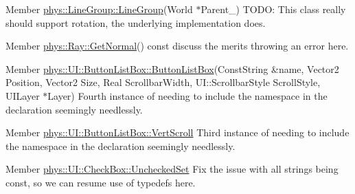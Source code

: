 \label{dd/da0/todo__todo000016}
\hypertarget{dd/da0/todo__todo000016}{}
 
\begin{DoxyDescription}
\item[Member \hyperlink{classphys_1_1LineGroup_a676039a6beec56d24c631e9da5fd7e76}{phys::LineGroup::LineGroup}(World $\ast$Parent\_\-) ]TODO: This class really should support rotation, the underlying implementation does. 
\end{DoxyDescription}

\label{dd/da0/todo__todo000021}
\hypertarget{dd/da0/todo__todo000021}{}
 
\begin{DoxyDescription}
\item[Member \hyperlink{classphys_1_1Ray_a7445c25acb6ce865ef85e7ada829ccba}{phys::Ray::GetNormal}() const  ]discuss the merits throwing an error here. 
\end{DoxyDescription}

\label{dd/da0/todo__todo000022}
\hypertarget{dd/da0/todo__todo000022}{}
 
\begin{DoxyDescription}
\item[Member \hyperlink{classphys_1_1UI_1_1ButtonListBox_a1360d155570a277a169b54a6c85ace0d}{phys::UI::ButtonListBox::ButtonListBox}(ConstString \&name, Vector2 Position, Vector2 Size, Real ScrollbarWidth, UI::ScrollbarStyle ScrollStyle, UILayer $\ast$Layer) ]Fourth instance of needing to include the namespace in the declaration seemingly needlessly. 
\end{DoxyDescription}

\label{dd/da0/todo__todo000023}
\hypertarget{dd/da0/todo__todo000023}{}
 
\begin{DoxyDescription}
\item[Member \hyperlink{classphys_1_1UI_1_1ButtonListBox_aa47d94d75c58e3408a97766eace2c20e}{phys::UI::ButtonListBox::VertScroll} ]Third instance of needing to include the namespace in the declaration seemingly needlessly. 
\end{DoxyDescription}

\label{dd/da0/todo__todo000024}
\hypertarget{dd/da0/todo__todo000024}{}
 
\begin{DoxyDescription}
\item[Member \hyperlink{classphys_1_1UI_1_1CheckBox_a7b670d93f119193283ec78b94f842429}{phys::UI::CheckBox::UncheckedSet} ]Fix the issue with all strings being const, so we can resume use of typedefs here. 
\end{DoxyDescription}

